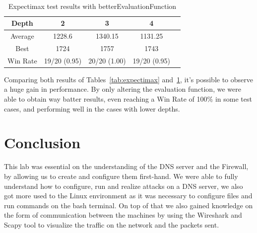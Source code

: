 \documentclass{article}
\begin{document}
~\\
\begin{table}[!ht]
  \begin{center}
    \begin{tabular}{||c||c|c|c|c||}
      \hline
      Depth & 2 & 3 & 4 \\
      \hline\hline
      Average &  1228.6 &  1340.15 &  1131.25 \\
      \hline\hline
      Best & 1724 & 1757 & 1743 \\
      \hline\hline
      Win Rate & 19/20 (0.95) & 20/20 (1.00) & 19/20 (0.95) \\
      \hline
    \end{tabular}
    \caption{Expectimax test results with betterEvaluationFunction}
    \label{tab:expectimax-better}
  \end{center}
\end{table}

Comparing both results of Tables~\ref{tab:expectimax} and~\ref{tab:expectimax-better}, it's possible to observe a huge gain in performance. By only altering the evaluation function, we were able to obtain way batter results, even reaching a Win Rate of 100\% in some test cases, and performing well in the cases with lower depths.

\pagebreak
\section{Conclusion}

This lab was essential on the understanding of the DNS server and the Firewall, by allowing us to create and configure them first-hand.
We were able to fully understand how to configure, run and realize attacks on a DNS server, we also got more used to the Linux environment as it was necessary to configure files and run commands on the bash terminal.
On top of that we also gained knowledge on the form of communication between the machines by using the Wireshark and Scapy tool to visualize the traffic on the network and the packets sent.
\end{document}
